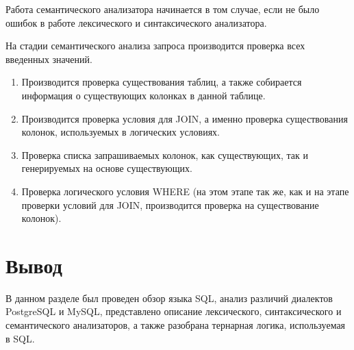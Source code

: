 Работа семантического анализатора начинается в том случае, если не было ошибок в работе лексического и синтаксического анализатора.

На стадии семантического анализа запроса производится проверка всех введенных значений.
\begin{enumerate}
	\item Производится проверка существования таблиц, а также собирается информация о существующих колонках в данной таблице.
	\item Производится проверка условия для JOIN, а именно проверка существования колонок, используемых в логических условиях.
	\item Проверка списка запрашиваемых колонок, как существующих, так и генерируемых на основе существующих. 
	\item Проверка логического условия WHERE (на этом этапе так же, как и на этапе проверки условий для JOIN, производится проверка на существование колонок).
\end{enumerate}




\section{Вывод}

В данном разделе был проведен обзор языка SQL, анализ различий диалектов PostgreSQL и MySQL, представлено описание лексического, синтаксического и семантического анализаторов, а также разобрана тернарная логика, используемая в SQL.
